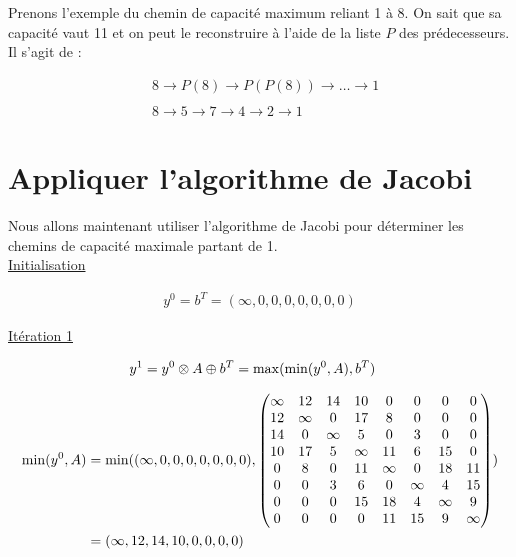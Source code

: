 \documentclass{article}
\begin{document}
Prenons l'exemple du chemin de capacité maximum reliant 1 à 8. On sait
que sa capacité vaut 11 et on peut le reconstruire à l'aide de la
liste $P$ des prédecesseurs. Il s'agit de :

\begin{align*}
  &8 \rightarrow P(8) \rightarrow P(P(8)) \rightarrow \dots \rightarrow 1\\\\
  &8 \rightarrow 5 \rightarrow 7 \rightarrow 4 \rightarrow 2 \rightarrow 1
\end{align*}

\section{Appliquer l'algorithme de Jacobi}

Nous allons maintenant utiliser l'algorithme de Jacobi pour déterminer
les chemins de capacité maximale partant de 1.\\

\underline{Initialisation}

\begin{align*}
  y^0 = b^T = (\infty, 0, 0, 0, 0, 0, 0, 0)
\end{align*}

\underline{Itération 1}

\begin{align*}
  y^1 &= y^0 \otimes A \oplus b^T = \operatorname{max}(\operatorname{min}(y^0,A),b^T)
\end{align*}

\begin{align*}
  \operatorname{min}(y^0,A) &= \operatorname{min}((\infty,0,0,0,0,0,0,0),
  \begin{pmatrix}
      \infty & 12 & 14 & 10 & 0 & 0 & 0 & 0 \\
      12 & \infty & 0 & 17 & 8 & 0 & 0 & 0 \\
      14 & 0 & \infty & 5 & 0 & 3 & 0 & 0 \\
      10 & 17 & 5 & \infty & 11 & 6 & 15 & 0 \\
      0 & 8 & 0 & 11 & \infty & 0 & 18 & 11 \\
      0 & 0 & 3 & 6 & 0 & \infty & 4 & 15 \\
      0 & 0 & 0 & 15 & 18 & 4 & \infty & 9 \\
      0 & 0 & 0 & 0 & 11 & 15 & 9 & \infty
  \end{pmatrix})\\
  &= (\infty,12,14,10,0,0,0,0)
\end{align*}
\end{document}
